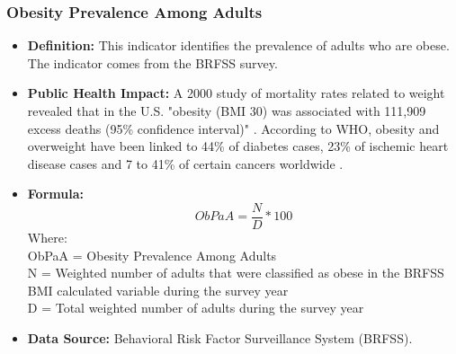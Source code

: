 \documentclass[12pt,letterpaper]{report}
\begin{document}
		\subsubsection{Obesity Prevalence Among Adults} 
	\begin{itemize}
		\item \textbf{Definition:} This indicator identifies the prevalence of adults who are obese. The indicator comes from the BRFSS survey.
		
		\item \textbf{Public Health Impact:} A 2000 study of mortality rates related to weight revealed that in the U.S. "obesity (BMI 30) was associated with 111,909 excess deaths (95\% confidence interval)" \cite{flegal2005excess}. According to WHO, obesity and overweight have been linked to 44\% of diabetes cases, 23\% of ischemic heart disease cases and 7 to 41\% of certain cancers worldwide \cite{mathers2009global}. 
		
		\item \textbf{Formula:} 
			\begin{equation}
				ObPaA = \frac{N}{D} *100
			\end{equation}
Where: \\
			ObPaA = Obesity Prevalence Among Adults \\
			
			N = Weighted number of adults that were classified as obese in the BRFSS BMI calculated variable during the survey year \\
			
			D = Total weighted number of adults during the survey year \\

		\item \textbf{Data Source:} Behavioral Risk Factor Surveillance System (BRFSS). 
	\end{itemize}

\end{document}
